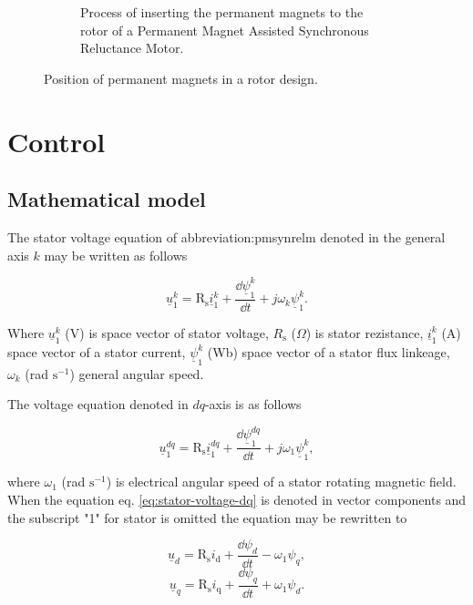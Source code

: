 \documentclass[a4paper, twoside, 11pt]{article}
\begin{document}
\begin{figure}[H]
\begin{subfigure}{0.4\textwidth}
            \caption{Process of inserting the permanent magnets to the rotor of a Permanent Magnet Assisted Synchronous Reluctance Motor. \cite{wang-synchronous-motors-for-traction-applications}}
            \label{fig:pm-inserted}
    \end{subfigure}
    \caption{Position of permanent magnets in a rotor design.}
\end{figure}

\FloatBarrier
\section{Control}

    \subsection{Mathematical model}
        The stator voltage equation of \gls{abbreviation:pmsynrelm} denoted in the general axis $k$ may be written as follows

        \begin{equation}
            \underline{u}^k_1 = \text{R}_\text{s} \underline{i}^k_1 + \frac{\dd \underline{\psi}^k_1 }{\dd t} + j \omega_k \underline{\psi}^k_1.
        \end{equation}

        Where $\underline{u}^k_1$ (V) is space vector of stator voltage, $R_\text{s}$ ($\Omega$) is stator rezistance, $\underline{i}^k_1$ (A) space vector of a stator current, $\underline{\psi}^k_1$ (Wb) space vector of a stator flux linkeage, $\omega_k$ (rad $\text{s}^{-1}$) general angular speed.\par
        The voltage equation denoted in $dq$-axis is as follows

        \begin{equation}\label{eq:stator-voltage-dq}
            \underline{u}^{dq}_1 = \text{R}_\text{s} \underline{i}^{dq}_1 + \frac{\dd \underline{\psi}^{dq}_1 }{\dd t} + j \omega_1 \underline{\psi}^k_1,
        \end{equation}
        
        where $\omega_1$ (rad $\text{s}^{-1}$) is electrical angular speed of a stator rotating magnetic field. When the equation eq. \ref{eq:stator-voltage-dq} is denoted in vector components and the subscript "1" for stator is omitted the equation may be rewritten to

        \begin{equation}
            \underline{u}_d = \text{R}_\text{s} i_\text{d} + \frac{\dd \psi_d}{\dd t} - \omega_1\psi_q,
        \end{equation}
        \begin{equation}
            \underline{u}_q = \text{R}_\text{s} i_\text{q} + \frac{\dd \psi_q}{\dd t} + \omega_1\psi_d.
        \end{equation}
\end{document}
